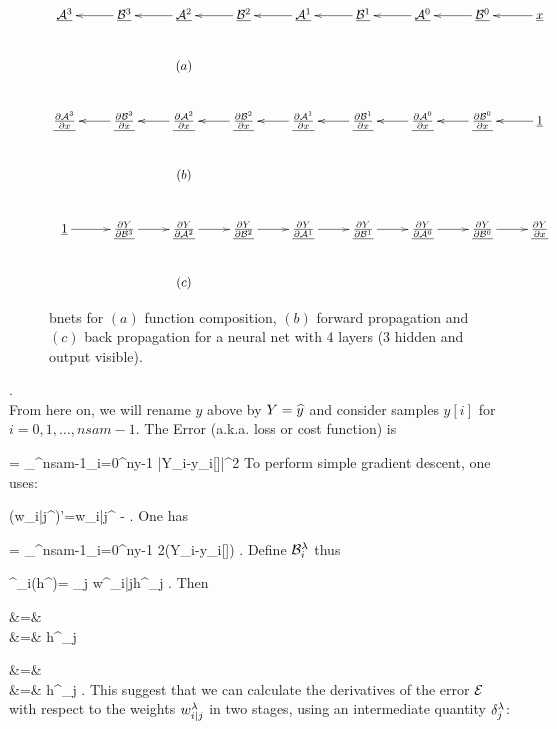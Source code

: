\begin{figure}[h!]
\centering
$$
\xymatrix{
\ul{\cala^3}
&
\ul{\calb^3}\ar[l]
&
\ul{\cala^2}\ar[l]
&
\ul{\calb^2}\ar[l]
&
\ul{\cala^1}\ar[l]
&
\ul{\calb^1}\ar[l]
&
\ul{\cala^0}\ar[l]
&
\ul{\calb^0}\ar[l]
&
\rvx\ar[l]
\\
&&\text{$(a)$}
\\
\ul{\pder{\cala^3}{x}}
&
\ul{\pder{\calb^3}{x}}\ar[l]
&
\ul{\pder{\cala^2}{x}}\ar[l]
&
\ul{\pder{\calb^2}{x}}\ar[l]
&
\ul{\pder{\cala^1}{x}}\ar[l]
&
\ul{\pder{\calb^1}{x}}\ar[l]
&
\ul{\pder{\cala^0}{x}}\ar[l]
&
\ul{\pder{\calb^0}{x}}\ar[l]
&
\ul{1}\ar[l]
\\
&&\text{$(b)$}
\\
\ul{1}\ar[r]
&
\ul{\pder{Y}{\calb^3}}\ar[r]
&
\ul{\pder{Y}{\cala^2}}\ar[r]
&
\ul{\pder{Y}{\calb^2}}\ar[r]
&
\ul{\pder{Y}{\cala^1}}\ar[r]
&
\ul{\pder{Y}{\calb^1}}\ar[r]
&
\ul{\pder{Y}{\cala^0}}\ar[r]
&
\ul{\pder{Y}{\calb^0}}\ar[r]
&
\ul{\pder{Y}{x}}
\\
&&\text{$(c)$}
}
$$
\caption{bnets for $(a)$ function
composition, $(b)$
forward propagation and $(c)$ back propagation
for a neural net with 4 layers (3 hidden and
output visible).}
\label{fig-backp-nn}
\end{figure}
.\\
From here on, we will rename $y$ above
by $Y=\widehat{y}$ and
consider samples $y[i]$ for 
$i=0, 1, \ldots, nsam-1$.
The Error (a.k.a. loss or cost function) is

\beq
\cale =
\sum_{}^{nsam-1}\sum_{i=0}^{ny-1}
|Y_i-y_i[\sigma]|^2
\eeq
To perform simple gradient descent,
one uses:

\beq
(w_{i|j}^\lam)'=w_{i|j}^\lam
-\eta{}
\;.
\eeq
One has

\beq
{}=
\sum_{}^{nsam-1}\sum_{i=0}^{ny-1}
2(Y_i-y_i[\sigma])
\;.
\eeq
Define ${\cal B}^\lambda_i$ thus


\beq
\calb^\lam_i(h^{})=
\sum_j w^{\lam}_{i|j}h^{}_j
\;.
\label{eq-calb}
\eeq
Then

\beqa
{}&=&
\\
&=&
h^{}_j
\eeqa

\beqa
{}&=&
\\
&=&
h^{}_j
\;.
\eeqa
This suggest that
we can calculate 
the derivatives of the error
${\cal E}$
with respect to the weights
$w^\lambda_{i|j}$ in two 
stages, using an intermediate 
quantity $\delta^\lambda_j$:


